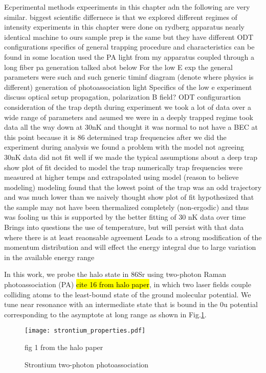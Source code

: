 Ecperimental methods
	expeeriments in this chapter adn the following are very similar. biggest scientific differnece is that we explored different regimes of intensity
	experiments in this chapter were done on rydberg apparatus
		nearly identical machine to ours 
			sample prep is the same but they have different ODT configurations
			specifics of general trapping procedure and characteristics can be found in some location
		used the PA light from my apparatus coupled through a long fiber
			pa generation talked abot below
		For the low E exp the general parameters were such and such
	generic timinf diagram (denote where physics is different)
generation of photoassociation light
Specifics of the low e experiment
	discuss optical setup
		propagation, polarization
	B field?
	ODT configurartion
		consideration of the trap depth
			during experiment we took a lot of data over a wide range of parameters and asumed we were in a deeply trapped regime
				took data all the way down at 30nK and thought it was normal to not have a BEC at this point because it is 86
			determined trap frequencies after we did the experiment
			during analysis we found a problem with the model not agreeing
				30nK data did not fit well if we made the typical assumptions about a deep trap
				show plot of fit
			decided to model the trap numerically
				trap frequencies were measured at higher temps and extrapolated using model (reason to believe modeling)
			modeling found that the lowest point of the trap was an odd trajectory and was much lower than we naively thought
				show plot of fit
				hypothesized that the sample may not have been thermalized completely (non-ergodic) and thus was fooling us
				this is supported by the better fitting of 30 nK data over time
			Brings into questions the use of temperature, but will persist with that data where there is at least reaonsable agreement
			Leads to a strong modification of the momentum distribution and will effect the energy integral due to large variation in the available energy range

In this work, we probe the halo state in 86Sr using two-photon Raman photoassociation (PA) \hl{cite 16 from halo paper}, in which two laser fields couple colliding atoms to the least-bound state of the ground molecular potential. We tune near resonance with an intermediate state that is bound in the 0u potential corresponding to the \intPot{\gs}{\ex} asymptote at long range as shown in Fig.\ref{fig:ch3_sr_pas}.

\begin{figure} \label{fig:ch3_sr_pas}
	\centerline{
	\texttt{[image: strontium\_properties.pdf]}}
	\caption{Strontium two-photon photoassociation}{fig 1 from the halo paper}
\end{figure} 

